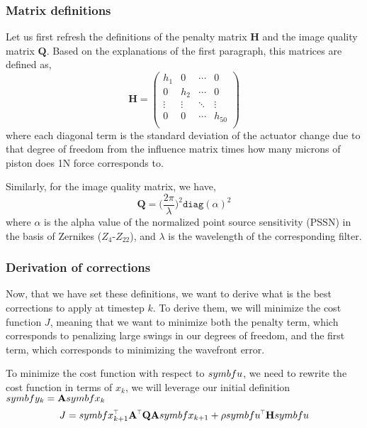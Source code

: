 \documentclass[SE,authoryear,toc]{lsstdoc}
\renewcommand{\v}[1]{\mathbf{#1}}
\newcommand{\tr}{\scalebox{0.6}{$\top$}}
\begin{document}
\subsubsection*{Matrix definitions}
Let us first refresh the definitions of the penalty matrix $\v{H}$ and the image quality matrix $\v{Q}$. Based on the explanations of the first paragraph, this matrices are defined as, 
\begin{equation}
    \v{H} = \left(
  \begin{array}{cccc}
    h_1 &   0     & \cdots & 0 \\
    0 &   h_2     & \cdots & 0 \\
    \vdots &   \vdots    & \ddots & \vdots \\
    0 &   0     & \cdots & h_{50}  \\
  \end{array}
\right)
\end{equation}
where each diagonal term is the standard deviation of the actuator change due to that degree of freedom from the influence matrix times how many microns of piston does 1N force corresponds to.

Similarly, for the image quality matrix, we have,
\begin{equation}
    \v{Q} = \Big(\frac{2\pi}{\lambda}\Big) ^2 \texttt{diag}(\alpha)^2
\end{equation}
where $\alpha$ is the alpha value of the normalized point source sensitivity (PSSN) in the basis of Zernikes ($Z_4$-$Z_{22}$), and $\lambda$ is the wavelength of the corresponding filter.

\subsubsection*{Derivation of corrections}
Now, that we have set these definitions, we want to derive what is the best corrections to apply at timestep $k$. To derive them, we will minimize the cost function $J$, meaning that we want to minimize both the penalty term, which corresponds to penalizing large swings in our degrees of freedom, and the first term, which corresponds to minimizing the wavefront error.

To minimize the cost function with respect to $\\symbf{u}$, we need to rewrite the cost function in terms of $x_k$, we will leverage our initial definition $\\symbf{y}_k = \v{A} \\symbf{x}_k$
\begin{equation}
     J = \\symbf{x}_{k+1}^{\tr}\v{A}^{\tr}\v{Q}\v{A}\\symbf{x}_{k+1} + \rho \\symbf{u}^{\tr}\v{H}\\symbf{u}
\end{equation}
\end{document}
